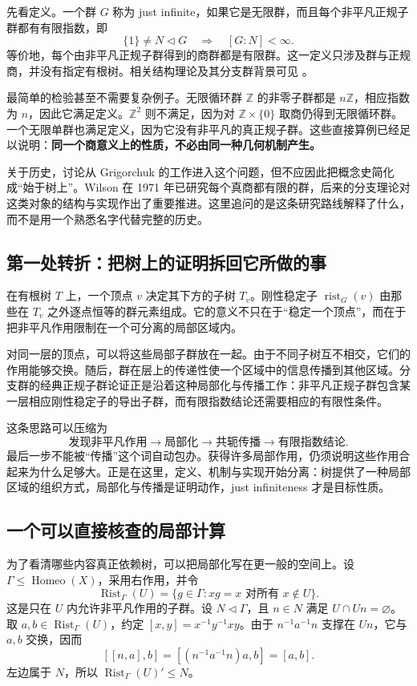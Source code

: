 \documentclass[UTF8,zihao=-4,fontset=none,oneside,openany]{ctexbook}
\newcommand{\Rist}{\operatorname{Rist}}
\newcommand{\rist}{\operatorname{rist}}
\begin{document}
先看定义。一个群 $G$ 称为 just infinite，如果它是无限群，而且每个非平凡正规子群都有有限指数，即
\[
  \{1\}\ne N\triangleleft G\quad\Longrightarrow\quad [G:N]<\infty.
\]
等价地，每个由非平凡正规子群得到的商群都是有限群。这一定义只涉及群与正规商，并没有指定有根树。相关结构理论及其分支群背景可见 \cite[Introduction, Chapter~5]{bgs03}。

最简单的检验甚至不需要复杂例子。无限循环群 $\mathbb Z$ 的非零子群都是 $n\mathbb Z$，相应指数为 $n$，因此它满足定义。$\mathbb Z^2$ 则不满足，因为对 $\mathbb Z\times\{0\}$ 取商仍得到无限循环群。一个无限单群也满足定义，因为它没有非平凡的真正规子群。这些直接算例已经足以说明：\textbf{同一个商意义上的性质，不必由同一种几何机制产生。}

关于历史，讨论从 Grigorchuk 的工作进入这个问题，但不应因此把概念史简化成“始于树上”。Wilson 在 1971 年已研究每个真商都有限的群，后来的分支理论对这类对象的结构与实现作出了重要推进。这里追问的是这条研究路线解释了什么，而不是用一个熟悉名字代替完整的历史。\cite[Introduction]{bgs03}

\subsection*{第一处转折：把树上的证明拆回它所做的事}
在有根树 $T$ 上，一个顶点 $v$ 决定其下方的子树 $T_v$。刚性稳定子 $\rist_G(v)$ 由那些在 $T_v$ 之外逐点恒等的群元素组成。它的意义不只在于“稳定一个顶点”，而在于把非平凡作用限制在一个可分离的局部区域内。

对同一层的顶点，可以将这些局部子群放在一起。由于不同子树互不相交，它们的作用能够交换。随后，群在层上的传递性使一个区域中的信息传播到其他区域。分支群的经典正规子群论证正是沿着这种局部化与传播工作：非平凡正规子群包含某一层相应刚性稳定子的导出子群，而有限指数结论还需要相应的有限性条件。\cite[Theorem~5.2, Lemma~5.3]{bgs03}

这条思路可以压缩为
\[
\text{发现非平凡作用}
\longrightarrow
\text{局部化}
\longrightarrow
\text{共轭传播}
\longrightarrow
\text{有限指数结论}.
\]
最后一步不能被“传播”这个词自动包办。获得许多局部作用，仍须说明这些作用合起来为什么足够大。正是在这里，定义、机制与实现开始分离：树提供了一种局部区域的组织方式，局部化与传播是证明动作，just infiniteness 才是目标性质。

\subsection*{一个可以直接核查的局部计算}
为了看清哪些内容真正依赖树，可以把局部化写在更一般的空间上。设 $\Gamma\leq\operatorname{Homeo}(X)$，采用右作用，并令
\[
\Rist_\Gamma(U)=\{g\in\Gamma:xg=x\text{ 对所有 }x\notin U\}.
\]
这是只在 $U$ 内允许非平凡作用的子群。设 $N\triangleleft\Gamma$，且 $n\in N$ 满足 $U\cap Un=\varnothing$。取 $a,b\in\Rist_\Gamma(U)$，约定 $[x,y]=x^{-1}y^{-1}xy$。由于 $n^{-1}a^{-1}n$ 支撑在 $Un$，它与 $a,b$ 交换，因而
\[
 [[n,a],b]
 =[(n^{-1}a^{-1}n)a,b]
 =[a,b].
\]
左边属于 $N$，所以 $\Rist_\Gamma(U)'\leq N$。
\end{document}
